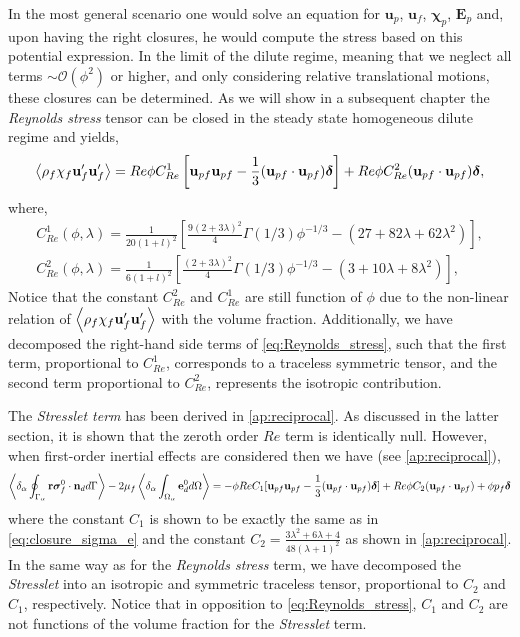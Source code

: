 In the most general scenario one would solve an equation for $\textbf{u}_p$, $\textbf{u}_f$, $\bm\chi_p$, $\textbf{E}_p$ and, upon having the right closures, he would compute the stress based on this potential expression. 
In the limit of the dilute regime, meaning that we neglect all terms $\sim \mathcal{O}(\phi^2)$ or higher, and only considering relative translational motions, these closures can be determined. 
As we will show in a subsequent chapter the \textit{Reynolds stress} tensor can be closed in the steady state homogeneous dilute regime and yields, 
\begin{equation}
    \avg{\rho_f\chi_f\textbf{u}_f'\textbf{u}'_f}
    = Re  \phi C_{Re}^1 \left[
        \textbf{u}_{pf}
        \textbf{u}_{pf}
        -\frac{1}{3}
        (\textbf{u}_{pf}
        \cdot\textbf{u}_{pf})\bm\delta
    \right]
    + Re \phi C_{Re}^2 (\textbf{u}_{pf}\cdot\textbf{u}_{pf}) \bm\delta, 
    \label{eq:Reynolds_stress}
\end{equation}
where, 
\begin{align*}
    C_{Re}^1(\phi,\lambda)
    = \frac{1}{20(1+l)^2}\left[
        \frac{9(2+3\lambda)^2}{4}\Gamma(1/3) \phi^{-1/3}
        - (27+82\lambda +62\lambda^2)
    \right],\\
    C_{Re}^2(\phi,\lambda)
    = \frac{1}{6(1+l)^2}\left[
        \frac{(2+3\lambda)^2}{4}\Gamma(1/3) \phi^{-1/3}
        - (3+10\lambda +8\lambda^2)
    \right],
\end{align*}
Notice that the constant $C_{Re}^2$ and $C_{Re}^1$ are still function of $\phi$ due to the non-linear relation of $\left<\rho_f\chi_f\textbf{u}_f'\textbf{u}'_f\right>$ with the volume fraction. 
Additionally, we have decomposed the right-hand side terms of \ref{eq:Reynolds_stress}, such that the first term, proportional to $C_{Re}^1$, corresponds to a traceless symmetric tensor, and the second term proportional to $C_{Re}^2$, represents the isotropic contribution.  

The \textit{Stresslet term} has been derived in \ref{ap:reciprocal}. 
As discussed in the latter section, it is shown that the zeroth order $Re$ term is identically null. 
However, when first-order inertial effects are considered then we have (see \ref{ap:reciprocal}),
\begin{equation*}
    \pSavg{\textbf{r}\bm{\sigma}_f^0 \cdot \textbf{n}_d}
    - 2 \mu_f \pOavg{\textbf{e}_d^0}
    =
    - \phi Re C_1
    [
        \textbf{u}_{pf}\textbf{u}_{pf} - \frac{1}{3}(\textbf{u}_{pf}\cdot \textbf{u}_{pf})\bm\delta 
    ]\\
    + Re \phi C_2 (\textbf{u}_{pf}\cdot \textbf{u}_{pf}) 
    + \phi p_f \bm\delta
    \label{eq:stresslet_trans}
\end{equation*} 
where the constant $C_1$ is shown to be exactly the same as in \ref{eq:closure_sigma_e} and the constant $C_2 =\frac{3\lambda^2 + 6\lambda + 4}{48(\lambda +1 )^2}$ as shown in \ref{ap:reciprocal}. 
In the same way as for the \textit{Reynolds stress} term, we have decomposed the \textit{Stresslet} into an isotropic and symmetric traceless tensor, proportional to $C_2$ and $C_1$, respectively. 
Notice that in opposition to \ref{eq:Reynolds_stress}, $C_1$ and $C_2$ are not functions of the volume fraction for the \textit{Stresslet} term. 

